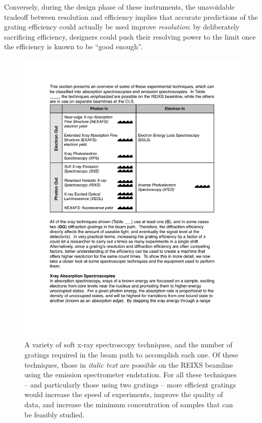  Conversely, during the design phase of these instruments, the unavoidable tradeoff between resolution and efficiency implies that accurate predictions of the grating efficiency could actually be used improve \emph{resolution}: by deliberately sacrificing efficiency, designers could push their resolving power to the limit once the efficiency is known to be ``good enough''.
 
 \begin{figure}[htbp] %
   \centering
   \includegraphics[scale=0.8]{../data/Chapter1/1h_techniques/1h.pdf} 
   \caption[A variety of soft x-ray spectroscopy techniques, and the number of gratings required in the beam path to accomplish each one.]{A variety of soft x-ray spectroscopy techniques, and the number of gratings required in the beam path to accomplish each one.  Of these techniques, those in \emph{italic text} are possible on the REIXS beamline using the emission spectrometer endstation.  For all these techniques -- and particularly those using two gratings -- more efficient gratings would increase the speed of experiments, improve the quality of data, and increase the minimum concentration of samples that can be feasibly studied.}
   \label{1h}
\end{figure}
 